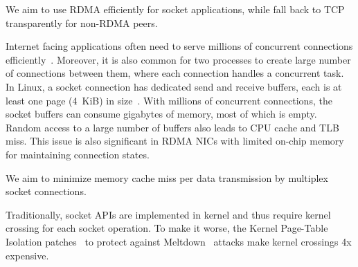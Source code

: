 We aim to use RDMA efficiently for socket applications, while fall back to TCP transparently for non-RDMA peers.

Internet facing applications often need to serve millions of concurrent connections efficiently~\cite{nishtala2013scaling,lin2016scalable,belay2017ix}.
Moreover, it is also common for two processes to create large number of connections between them, where each connection handles a concurrent task.
In Linux, a socket connection has dedicated send and receive buffers, each is at least one page (4~KiB) in size~\cite{davidskbs}. With millions of concurrent connections, the socket buffers can consume gigabytes of memory, most of which is empty.
Random access to a large number of buffers also leads to CPU cache and TLB miss.
This issue is also significant in RDMA NICs with limited on-chip memory for maintaining connection states.

We aim to minimize memory cache miss per data transmission by multiplex socket connections.


Traditionally, socket APIs are implemented in kernel and thus require kernel crossing for each socket operation.
To make it worse, the Kernel Page-Table Isolation patches~\cite{kpti} to protect against Meltdown~\cite{Lipp2018meltdown} attacks make kernel crossings 4x expensive.

